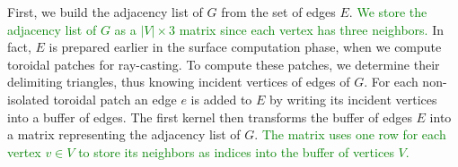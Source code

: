 First, we build the adjacency list of $G$ from the set of edges $E$.
\textcolor{green}{We store the adjacency list of $G$ as a $|V| \times 3$ matrix since each vertex has three neighbors.}
In fact, $E$ is prepared earlier in the surface computation phase, when we compute toroidal patches for ray-casting.
To compute these patches, we determine their delimiting triangles, thus knowing incident vertices of edges of $G$.
For each non-isolated toroidal patch an edge $e$ is added to $E$ by writing its incident vertices into a buffer of edges.
The first kernel then transforms the buffer of edges $E$ into a matrix representing the adjacency list of $G$.
\textcolor{green}{The matrix uses one row for each vertex $v \in V$ to store its neighbors as indices into the buffer of vertices $V$.}

